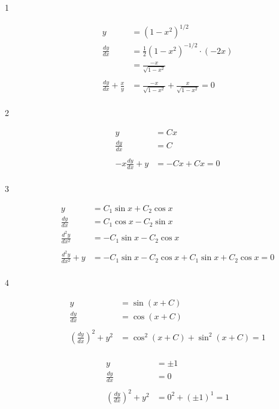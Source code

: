 \documentclass{exam}
\begin{document}
\begin{description}
\item[1]
\begin{align*}
  y &= \left( 1 - x^2 \right)^{1/2} \\
  \frac{dy}{dx} &= \frac{1}{2} \left( 1 - x^2 \right)^{-1/2} \cdot (-2x) \\
  &= \frac{-x}{\sqrt{1 - x^2}} \\
\\
  \frac{dy}{dx} + \frac{x}{y} &= \frac{-x}{\sqrt{1 - x^2}} + \frac{x}{\sqrt{1 - x^2}} = 0 \\
\end{align*}

\item[2]
\begin{align*}
  y &= Cx \\
 \frac{dy}{dx} &= C \\
\\
  -x \frac{dy}{dx} + y &= -Cx + Cx = 0 \\
\end{align*}

\item[3]
\begin{align*}
  y &= C_1 \sin x + C_2 \cos x \\
  \frac{dy}{dx} &= C_1 \cos x - C_2 \sin x \\
  \frac{d^2y}{dx^2} &= -C_1 \sin x - C_2 \cos x \\
\\
  \frac{d^2y}{dx^2} + y &= -C_1 \sin x - C_2 \cos x + C_1 \sin x + C_2 \cos x = 0 \\
\end{align*}

\item[4]
\begin{align*}
  y &= \sin(x + C) \\
  \frac{dy}{dx} &= \cos(x + C) \\
\\
  \left( \frac{dy}{dx} \right)^2 + y^2 &= \cos^2(x + C) + \sin^2(x + C) = 1 \\
\end{align*}

\begin{align*}
  y &= \pm 1 \\
  \frac{dy}{dx} &= 0 \\
\\
  \left( \frac{dy}{dx} \right)^2 + y^2 &= 0^2 + (\pm 1)^1 = 1 \\
\end{align*}


\end{description}
\end{document}
